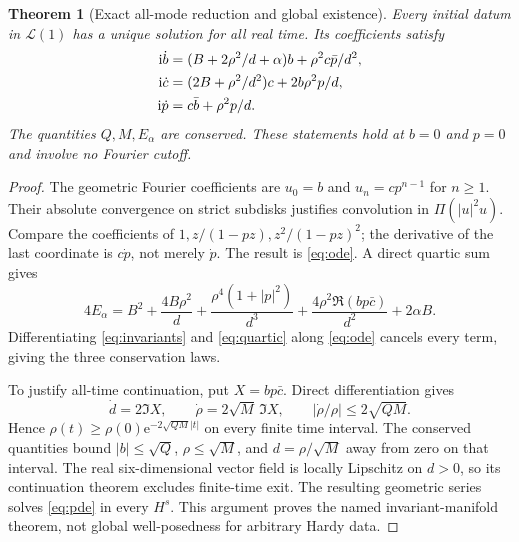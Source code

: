 \documentclass[10pt]{article}
\newcommand{\ii}{\mathrm i}
\newcommand{\e}{\mathrm e}
\newcommand{\LL}{\mathcal L}
\newtheorem{theorem}{Theorem}
\begin{document}
\begin{theorem}[Exact all-mode reduction and global existence]
Every initial datum in $\LL(1)$ has a unique solution for all real time.
Its coefficients satisfy
\begin{align}
 \ii\dot b&=(B+2\rho^2/d+\alpha)b+\rho^2c\bar p/d^2,\notag\\
 \ii\dot c&=(2B+\rho^2/d^2)c+2b\rho^2p/d,\label{eq:ode}\\
 \ii\dot p&=c\bar b+\rho^2p/d.\notag
\end{align}
The quantities $Q,M,E_\alpha$ are conserved. These statements hold at
$b=0$ and $p=0$ and involve no Fourier cutoff.
\end{theorem}
\begin{proof}
The geometric Fourier coefficients are $u_0=b$ and $u_n=cp^{n-1}$ for
$n\ge1$. Their absolute convergence on strict subdisks justifies convolution
in $\Pi(|u|^2u)$. Compare the coefficients of
$1,z/(1-pz),z^2/(1-pz)^2$; the derivative of the last coordinate is
$c\dot p$, not merely $\dot p$. The result is \eqref{eq:ode}.
A direct quartic sum gives
\begin{equation}
 4E_\alpha=B^2+\frac{4B\rho^2}{d}
  +\frac{\rho^4(1+|p|^2)}{d^3}
  +\frac{4\rho^2\Re(bp\bar c)}{d^2}+2\alpha B.
 \label{eq:quartic}
\end{equation}
Differentiating \eqref{eq:invariants} and \eqref{eq:quartic} along
\eqref{eq:ode} cancels every term, giving the three conservation laws.

To justify all-time continuation, put $X=bp\bar c$. Direct differentiation
gives
\begin{equation}
 \dot d=2\Im X,\qquad
 \dot\rho=2\sqrt M\,\Im X,\qquad
 |\dot\rho/\rho|\le2\sqrt{QM}.
 \label{eq:logbound}
\end{equation}
Hence $\rho(t)\ge\rho(0)\e^{-2\sqrt{QM}|t|}$ on every finite time interval.
The conserved quantities bound $|b|\le\sqrt Q$, $\rho\le\sqrt M$, and
$d=\rho/\sqrt M$ away from zero on that interval.
The real six-dimensional vector field is locally Lipschitz on $d>0$,
so its continuation theorem excludes finite-time exit.
The resulting geometric series solves \eqref{eq:pde} in every $H^s$.
This argument proves the named invariant-manifold theorem, not global
well-posedness for arbitrary Hardy data.
\end{proof}
\end{document}
